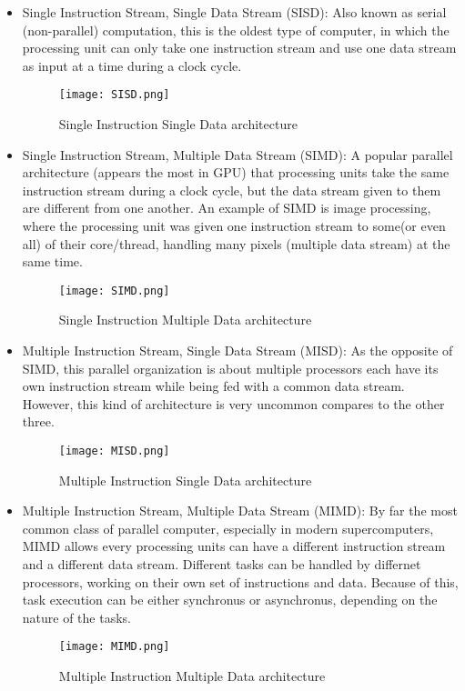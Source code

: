 \begin{itemize}
	\item Single Instruction Stream, Single Data Stream (SISD): Also known as serial (non-parallel) computation, this is the oldest type of computer, in which the processing unit can only take one instruction stream and use one data stream as input at a time during a clock cycle.
	\begin{figure}[H]
	\texttt{[image: SISD.png]}
	\centering
	\caption{Single Instruction Single Data architecture}
	\end{figure}
	\item Single Instruction Stream, Multiple Data Stream (SIMD): A popular parallel architecture (appears the most in GPU) that processing units take the same instruction stream during a clock cycle, but the data stream given to them are different from one another. An example of SIMD is image processing, where the processing unit was given one instruction stream to some(or even all) of their core/thread, handling many pixels (multiple data stream) at the same time.
	\begin{figure}[H]
	\texttt{[image: SIMD.png]}
	\centering
	\caption{Single Instruction Multiple Data architecture}
	\end{figure}
	\item Multiple Instruction Stream, Single Data Stream (MISD): As the opposite of SIMD, this parallel organization is about multiple processors each have its own instruction stream while being fed with a common data stream. However, this kind of architecture is very uncommon compares to the other three.
	\begin{figure}[H]
	\texttt{[image: MISD.png]}
	\centering
	\caption{Multiple Instruction Single Data architecture}
	\end{figure}
	\item Multiple Instruction Stream, Multiple Data Stream (MIMD): By far the most common class of parallel computer, especially in modern supercomputers, MIMD allows every processing units can have a different instruction stream and a different data stream. Different tasks can be handled by differnet processors, working on their own set of instructions and data. Because of this, task execution can be either synchronus or asynchronus, depending on the nature of the tasks.
	\begin{figure}[H]
	\texttt{[image: MIMD.png]}
	\centering
	\caption{Multiple Instruction Multiple Data architecture}
	\end{figure}
\end{itemize}


